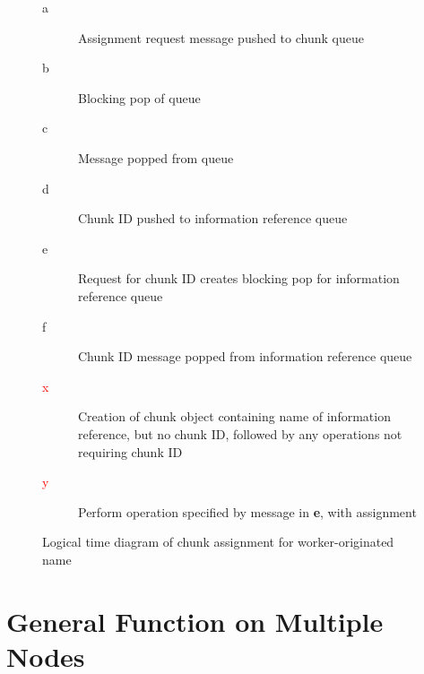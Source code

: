 \documentclass[a4paper,10pt]{article}
\begin{document}
\begin{figure}
	\begin{minipage}{0.4\textwidth}
	\end{minipage}
	\begin{minipage}{0.6\textwidth}
		\begin{description}
			\item [a] Assignment request message pushed to chunk
				queue
			\item [b] Blocking pop of queue
			\item [c] Message popped from queue
			\item [d] Chunk ID pushed to information reference
				queue
			\item [e] Request for chunk ID creates blocking pop for
				information reference queue
			\item [f] Chunk ID message popped from information
				reference queue
			\item [\textcolor{red}{x}] Creation of chunk object
				containing name of information reference, but
				no chunk ID, followed by any operations not
				requiring chunk ID
			\item [\textcolor{red}{y}] Perform operation specified
				by message in \textbf{e}, with assignment
		\end{description}
	\end{minipage}
	\caption{\label{fig:w-o-td}Logical time diagram of chunk assignment for
	worker-originated name}
\end{figure}

\section{General Function on Multiple Nodes}
\end{document}
